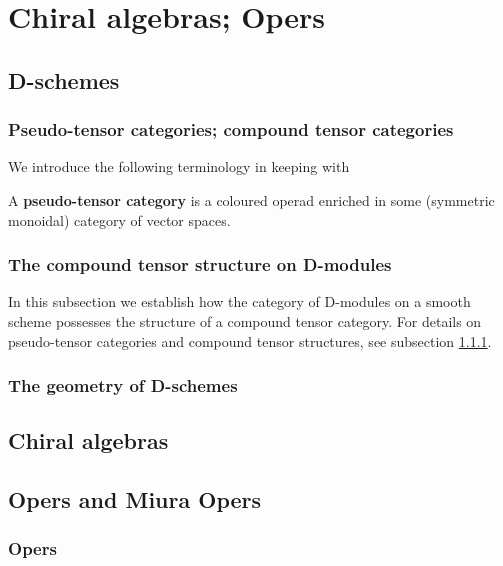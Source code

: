 \chapter{Chiral algebras; Opers}
    \begin{abstract}
        
    \end{abstract}
    
    \section{D-schemes}
        \subsection{Pseudo-tensor categories; compound tensor categories} \label{subsection: pseudo_and_compound_tensor_categories}
            We introduce the following terminology in keeping with \cite[Chapter 1]{beilinson2004chiral}
            \begin{definition} \label{def: }
                A \textbf{pseudo-tensor category} is a coloured operad enriched in some (symmetric monoidal) category of vector spaces. 
            \end{definition}
    
        \subsection{The compound tensor structure on D-modules}
            In this subsection we establish how the category of D-modules on a smooth scheme possesses the structure of a compound tensor category. For details on pseudo-tensor categories and compound tensor structures, see subsection \ref{subsection: pseudo_and_compound_tensor_categories}.
    
        \subsection{The geometry of D-schemes}
    
    \section{Chiral algebras}
    
    \section{Opers and Miura Opers}
        \subsection{Opers}
